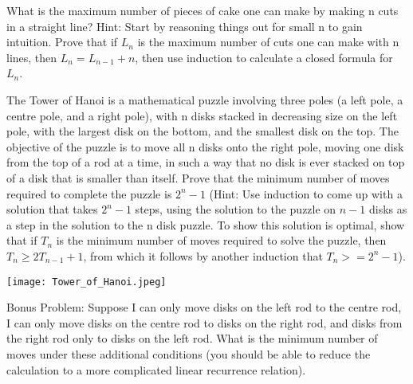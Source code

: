 \documentclass{exam}
\begin{document}
\begin{questions}
\question What is the maximum number of pieces of cake one can make by making n cuts in a straight line? Hint: Start by reasoning things out for small n to gain intuition. Prove that if $L_n$ is the maximum number of cuts one can make with n lines, then $L_n = L_{n-1} + n$, then use induction to calculate a closed formula for $L_n$.
\vspace{10em}

\question The Tower of Hanoi is a mathematical puzzle involving three poles (a left pole, a centre pole, and a right pole), with n disks stacked in decreasing size on the left pole, with the largest disk on the bottom, and the smallest disk on the top. The objective of the puzzle is to move all n disks onto the right pole, moving one disk from the top of a rod at a time, in such a way that no disk is ever stacked on top of a disk that is smaller than itself. Prove that the minimum number of moves required to complete the puzzle is $2^n - 1$ (Hint: Use induction to come up with a solution that takes $2^n - 1$ steps, using the solution to the puzzle on $n-1$ disks as a step in the solution to the n disk puzzle. To show this solution is optimal, show that if $T_n$ is the minimum number of moves required to solve the puzzle, then $T_n \geq 2T_{n-1} + 1$, from which it follows by another induction that $T_n >= 2^n - 1$).

\begin{center}
\texttt{[image: Tower\_of\_Hanoi.jpeg]}
\end{center}

Bonus Problem: Suppose I can only move disks on the left rod to the centre rod, I can only move disks on the centre rod to disks on the right rod, and disks from the right rod only to disks on the left rod. What is the minimum number of moves under these additional conditions (you should be able to reduce the calculation to a more complicated linear recurrence relation).
\vspace{10em}

\end{questions}
\end{document}
